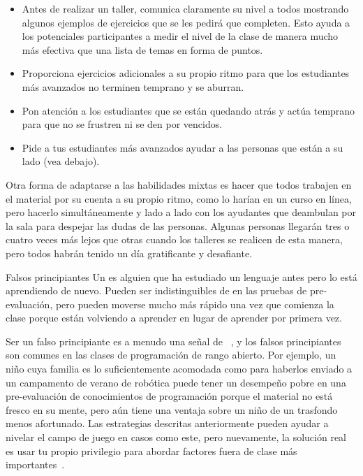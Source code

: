 \begin{itemize}

\item
  Antes de realizar un taller,
  comunica claramente su nivel a todos mostrando algunos ejemplos de ejercicios que se les pedirá que completen.
  Esto ayuda a los potenciales participantes a medir el nivel de la clase
  de manera mucho más efectiva que una lista de temas en forma de puntos.
 
\item
  Proporciona ejercicios adicionales a su propio ritmo
  para que los estudiantes más avanzados no terminen temprano y se aburran.

\item
  Pon atención a los estudiantes que se están quedando atrás
  y actúa temprano para que no se frustren ni se den por vencidos.

\item
  Pide a tus estudiantes más avanzados ayudar a las personas que están a su lado
  (vea  debajo).

\end{itemize}

Otra forma de adaptarse a las habilidades mixtas es
hacer que todos trabajen en el material por su cuenta a su propio ritmo,
como lo harían en un curso en línea,
pero hacerlo simultáneamente y lado a lado
con los ayudantes que deambulan por la sala para despejar las dudas de las personas.
Algunas personas llegarán tres o cuatro veces más lejos que otras cuando los talleres se realicen de esta manera,
pero todos habrán tenido un día gratificante y desafiante.

\begin{aside}{Falsos principiantes}
  Un  es alguien
  que ha estudiado un lenguaje antes pero lo está aprendiendo de nuevo.
  Pueden ser indistinguibles de 
  en las pruebas de pre-evaluación,
  pero pueden moverse mucho más rápido una vez que comienza la clase
  porque están volviendo a aprender en lugar de aprender por primera vez.
 
  Ser un falso principiante es a menudo una señal de ~\cite{Marg2010},
  y los falsos principiantes son comunes en las clases de programación de rango abierto.
  Por ejemplo,
  un niño cuya familia es lo suficientemente acomodada como para haberlos enviado a un campamento de verano de robótica
  puede tener un desempeño pobre en una pre-evaluación de conocimientos de programación
  porque el material no está fresco en su mente,
  pero aún tiene una ventaja sobre un niño de un trasfondo menos afortunado.
  Las estrategias descritas anteriormente pueden ayudar a nivelar el campo de juego en casos como este,
  pero nuevamente, la solución real es usar tu propio privilegio
  para abordar factores fuera de clase más importantes~\cite{Part2011}.
\end{aside}

